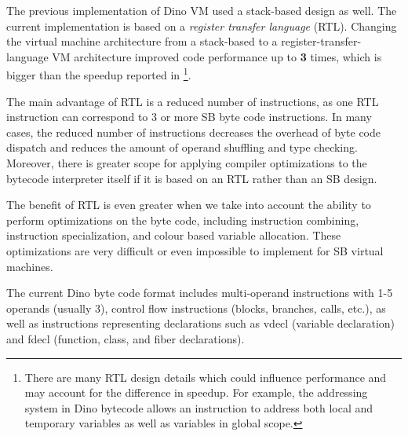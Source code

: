 \documentclass[preprint]{sigplanconf}
\begin{document}
The previous implementation of Dino VM used a stack-based design as well.
The current implementation is based on a \emph{register transfer
  language} (RTL).  Changing the virtual machine architecture from a stack-based to
a register-transfer-language VM architecture improved code
performance up to \textbf{3} times,
which is bigger than the speedup reported
in \cite{Shi}\footnote{There are many RTL design details
  which could influence performance    
  and may account for the difference in speedup.
  For example, the addressing system in Dino bytecode
  allows an instruction to address both local and temporary variables as well as
  variables in global scope.}.
  
  The main advantage of RTL is a reduced number of instructions, as one RTL instruction can correspond to 3 or more SB
byte code instructions. In many cases, the reduced number of instructions decreases 
the overhead of byte code dispatch and reduces the amount of operand shuffling and
type checking. Moreover, there is greater scope for 
applying compiler optimizations to the bytecode interpreter itself
if it is based on an RTL rather than an SB design.

  The benefit of RTL is even greater when we take into account the ability to
perform optimizations on the byte code, including instruction combining, instruction specialization, and colour based variable allocation. These optimizations are
very difficult or even impossible to implement for SB virtual machines.

  The current Dino byte code format includes multi-operand instructions
with 1-5 operands (usually 3), control flow instructions (blocks, branches, calls, etc.),
as well as instructions representing declarations such as vdecl (variable declaration)
and fdecl (function, class, and fiber declarations).
\end{document}
